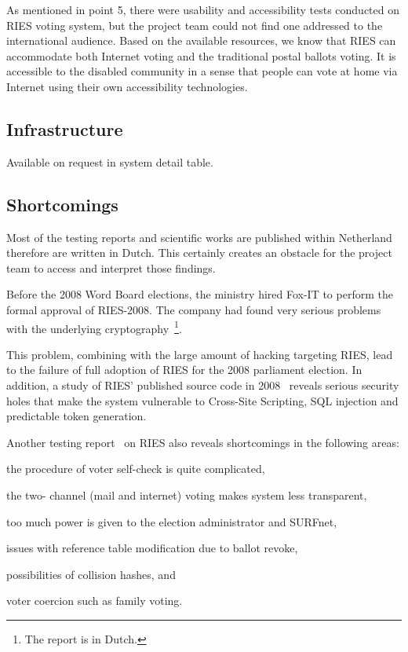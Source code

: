 As mentioned in point 5, there were usability and accessibility tests conducted on RIES voting system, but the project team could not find one addressed to the international audience. Based on the available resources, we know that RIES can accommodate both Internet voting and the traditional postal ballots voting. It is accessible to the disabled community in a sense that people can vote at home via Internet using their own accessibility technologies.

\subsection{Infrastructure}

Available on request in system detail table.

\subsection{Shortcomings}

Most of the testing reports and scientific works are published within Netherland therefore are written in Dutch. This certainly creates an obstacle for the project team to access and interpret those findings.

Before the 2008 Word Board elections, the ministry hired Fox-IT to perform the formal approval of RIES-2008. The company had found very serious problems with the underlying cryptography~\cite{gedrojc2008}\footnote{The report is in Dutch.}. \cite[p3]{gonggrijp2009}

This problem, combining with the large amount of hacking targeting RIES, lead to the failure of full adoption of RIES for the 2008 parliament election. In addition, a study of RIES' published source code in 2008~\cite{gonggrijp2009} reveals serious security holes that make the system vulnerable to Cross-Site Scripting, SQL injection and predictable token generation.

Another testing report~\cite{hubbers2004} on RIES also reveals shortcomings in the following areas:
\begin{enumerate*}
  \item the procedure of voter self-check is quite complicated,
  \item the two- channel (mail and internet) voting makes system less transparent,
  \item too much power is given to the election administrator and SURFnet,
  \item issues with reference table modification due to ballot revoke,
  \item possibilities of collision hashes, and
  \item voter coercion such as family voting.
\end{enumerate*}


